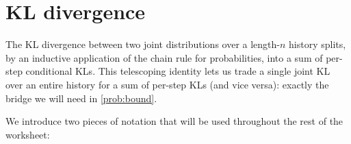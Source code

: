 \documentclass[fontsize=11pt, parskip=half]{scrartcl}
\theoremstyle{definition}
\newtheorem{definition}[theorem]{Definition}
\begin{document}
\section{KL divergence}\label{prob:chain_rule}

%
%

The KL divergence between two joint distributions over a length-$n$ history splits, by an inductive application of the chain rule for probabilities, into a sum of per-step conditional KLs. This telescoping identity lets us trade a single joint KL over an entire history for a sum of per-step KLs (and vice versa): exactly the bridge we will need in \cref{prob:bound}.

We introduce two pieces of notation that will be used throughout the rest of the worksheet:
\end{document}
